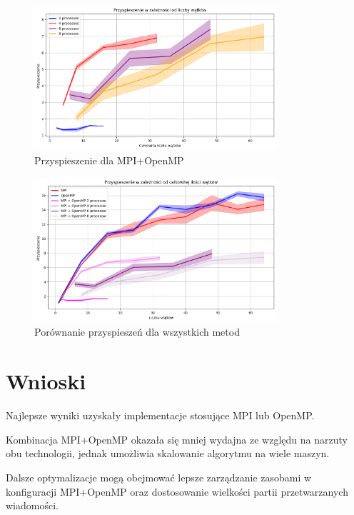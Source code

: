 \documentclass[a4paper,12pt]{article}
\begin{document}
\begin{figure}[h!]
	\centering
	\includegraphics[width=0.8\textwidth]{mpi_openmp.png}
	\caption{Przyspieszenie dla MPI+OpenMP}
	\label{fig:mpi_openmp}
\end{figure}

\begin{figure}[h!]
	\centering
	\includegraphics[width=0.8\textwidth]{all.png}
	\caption{Porównanie przyspieszeń dla wszystkich metod}
	\label{fig:all}
\end{figure}

\section{Wnioski}
Najlepsze wyniki uzyskały implementacje stosujące MPI lub OpenMP. 

Kombinacja MPI+OpenMP okazała się mniej wydajna ze względu na narzuty obu technologii, jednak umożliwia skalowanie algorytmu na wiele maszyn.

Dalsze optymalizacje mogą obejmować lepsze zarządzanie zasobami w konfiguracji MPI+OpenMP oraz dostosowanie wielkości partii przetwarzanych wiadomości.
\end{document}

